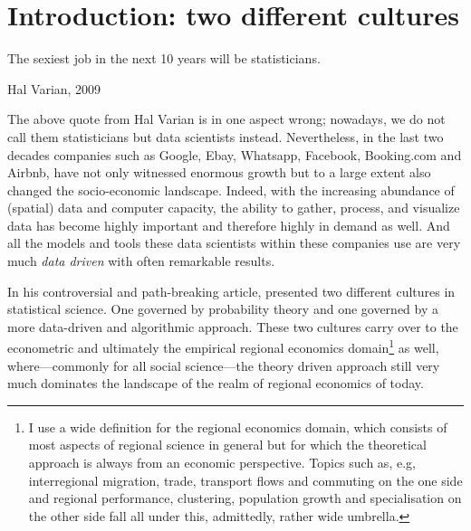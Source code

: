 \documentclass[fleqn,10pt]{SelfArx} %
\affiliation{\textsuperscript{1}\textit{Department of Spatial Economics, Vrije Universiteit Amsterdam, Amsterdam, The Netherlands}} %
\affiliation{*\textbf{Corresponding author}: \Letter{} t.de.graaff@vu.n; \Mundus{} \href{thomasdegraaff.nl}{thomasdegraaff.nl}} %
\begin{document}
\flushbottom %
\maketitle %
\tableofcontents %
\thispagestyle{empty} %


\section*{Introduction: two different cultures} %


\epigraph{The sexiest job in the next 10 years will be statisticians.}{Hal Varian, 2009}

The above quote from Hal Varian is in one aspect wrong; nowadays, we do not call
them statisticians but data scientists instead. Nevertheless, in the last two
decades companies such as Google, Ebay, Whatsapp, Facebook, Booking.com and
Airbnb, have not only witnessed enormous growth but to a large extent also changed the socio-economic landscape. Indeed, with the increasing abundance of (spatial) data and computer capacity, the ability to gather, process, and visualize data has become highly important and therefore highly in demand as well. And all the models and tools these data scientists within these companies use are very much \textit{data driven} with often remarkable results. 

In his controversial and path-breaking article, \citet{breiman2001statistical}
presented two different cultures in statistical science. One governed by
probability theory and one governed by a more data-driven and algorithmic
approach. These two cultures carry over to the econometric and ultimately the
empirical regional economics domain\footnote{I use a wide definition for the regional economics
 domain, which consists of most aspects of regional science in general but for
 which the theoretical approach is always from an economic perspective. Topics
 such as, e.g, interregional migration, trade, transport flows and commuting on
 the one side and regional performance, clustering, population growth and
 specialisation on the other side fall all under this, admittedly, rather wide umbrella.} as well, where---commonly for all social
science---the theory driven approach still very much dominates the landscape of the realm of regional economics of today. 
\end{document}
